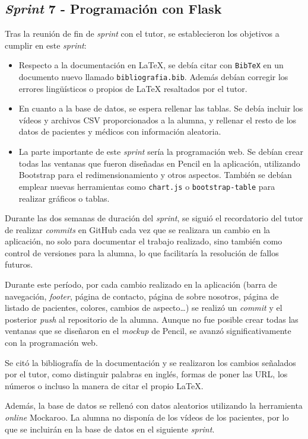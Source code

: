 \subsection{\textit{Sprint} 7 - Programación con Flask}
Tras la reunión de fin de \textit{sprint} con el tutor, se establecieron los objetivos a cumplir en este \textit{sprint}:
\begin{itemize}
    \item Respecto a la documentación en \LaTeX{}, se debía citar con \texttt{BibTeX} en un documento nuevo llamado \texttt{bibliografia.bib}. Además debían corregir los errores lingüísticos o propios de \LaTeX{} resaltados por el tutor.
    \item En cuanto a la base de datos, se espera rellenar las tablas. Se debía incluir los vídeos y archivos CSV proporcionados a la alumna, y rellenar el resto de los datos de pacientes y médicos con información aleatoria.
    \item La parte importante de este \textit{sprint} sería la programación web. Se debían crear todas las ventanas que fueron diseñadas en Pencil en la aplicación, utilizando Bootstrap para el redimensionamiento y otros aspectos. También se debían emplear nuevas herramientas como \texttt{chart.js} o \texttt{bootstrap-table} para realizar gráficos o tablas.
\end{itemize}

Durante las dos semanas de duración del \textit{sprint}, se siguió el recordatorio del tutor de realizar \textit{commits} en GitHub cada vez que se realizara un cambio en la aplicación, no solo para documentar el trabajo realizado, sino también como control de versiones para la alumna, lo que facilitaría la resolución de fallos futuros.

Durante este período, por cada cambio realizado en la aplicación (barra de navegación, \textit{footer}, página de contacto, página de sobre nosotros, página de listado de pacientes, colores, cambios de aspecto\ldots) se realizó un \textit{commit} y el posterior \textit{push} al repositorio de la alumna.  Aunque no fue posible crear todas las ventanas que se diseñaron en el \textit{mockup} de Pencil, se avanzó significativamente con la programación web.

Se citó la bibliografía de la documentación y se realizaron los cambios señalados por el tutor, como distinguir palabras en inglés, formas de poner las URL, los números o incluso la manera de citar el propio \LaTeX{}.

Además, la base de datos se rellenó con datos aleatorios utilizando la herramienta \textit{online} Mockaroo. La alumna no disponía de los vídeos de los pacientes, por lo que se incluirán en la base de datos en el siguiente \textit{sprint}.

